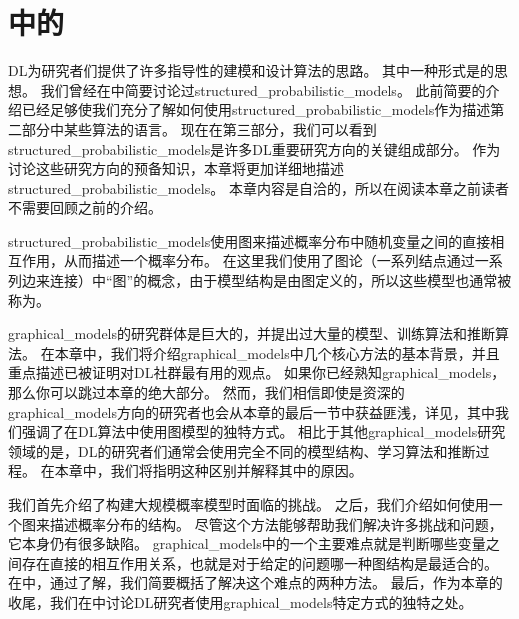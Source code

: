 \chapter{中的}
\label{chap:structured_probabilistic_models_for_deep_learning}


\gls{DL}为研究者们提供了许多指导性的建模和设计算法的思路。%
其中一种形式是的思想。
我们曾经在中简要讨论过\gls{structured_probabilistic_models}。
此前简要的介绍已经足够使我们充分了解如何使用\gls{structured_probabilistic_models}作为描述第二部分中某些算法的语言。
现在在第三部分，我们可以看到\gls{structured_probabilistic_models}是许多\gls{DL}重要研究方向的关键组成部分。
作为讨论这些研究方向的预备知识，本章将更加详细地描述\gls{structured_probabilistic_models}。
本章内容是自洽的，所以在阅读本章之前读者不需要回顾之前的介绍。


\gls{structured_probabilistic_models}使用图来描述概率分布中随机变量之间的直接相互作用，从而描述一个概率分布。
在这里我们使用了图论（一系列结点通过一系列边来连接）中``图''的概念，由于模型结构是由图定义的，所以这些模型也通常被称为。


\gls{graphical_models}的研究群体是巨大的，并提出过大量的模型、训练算法和推断算法。
在本章中，我们将介绍\gls{graphical_models}中几个核心方法的基本背景，并且重点描述已被证明对\gls{DL}社群最有用的观点。
如果你已经熟知\gls{graphical_models}，那么你可以跳过本章的绝大部分。
然而，我们相信即使是资深的\gls{graphical_models}方向的研究者也会从本章的最后一节中获益匪浅，详见，其中我们强调了在\gls{DL}算法中使用图模型的独特方式。
相比于其他\gls{graphical_models}研究领域的是，\gls{DL}的研究者们通常会使用完全不同的模型结构、学习算法和推断过程。
在本章中，我们将指明这种区别并解释其中的原因。


我们首先介绍了构建大规模概率模型时面临的挑战。
之后，我们介绍如何使用一个图来描述概率分布的结构。
尽管这个方法能够帮助我们解决许多挑战和问题，它本身仍有很多缺陷。
\gls{graphical_models}中的一个主要难点就是判断哪些变量之间存在直接的相互作用关系，也就是对于给定的问题哪一种图结构是最适合的。
在中，通过了解，我们简要概括了解决这个难点的两种方法。
最后，作为本章的收尾，我们在中讨论\gls{DL}研究者使用\gls{graphical_models}特定方式的独特之处。



